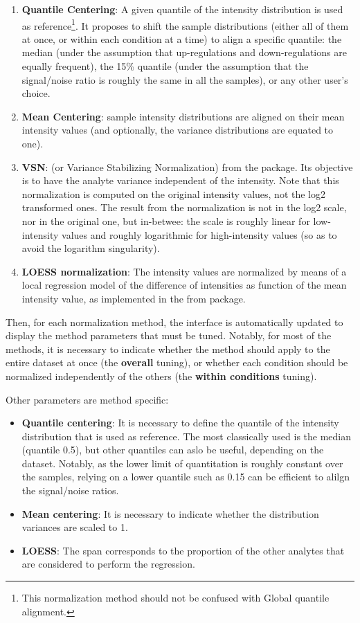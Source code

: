 \documentclass[12pt]{article}
\begin{document}
\begin{enumerate}
	\item \textbf{Quantile Centering}: A given quantile of the intensity distribution is used as reference\footnote{This normalization method should not be confused with Global quantile alignment.}. 
It proposes to shift the sample distributions 
(either all of them at once, or within each condition at a time) to align a specific 
quantile: the median (under the assumption that up-regulations and down-regulations 
are equally frequent), the 15\% quantile (under the assumption that the signal/noise ratio is 
roughly the same in all the samples), or any other user's choice.
	\item \textbf{Mean Centering}: sample intensity distributions are aligned on their mean intensity values (and optionally, the variance distributions are equated to one).
	\item \textbf{VSN}: (or Variance Stabilizing Normalization) from the  package. Its objective is to have the analyte variance independent of the intensity. Note that this normalization is computed on the original intensity values, not the log2 transformed ones. The result from the normalization is not in the log2 scale, nor in the original one, but in-betwee: the scale is roughly linear for low-intensity values and roughly logarithmic for high-intensity values (so as to avoid the logarithm singularity).
	\item \textbf{LOESS normalization}: The intensity values are normalized by means of a local regression model of the difference of intensities as function of the mean intensity value, as implemented in the  from  package.
\end{enumerate}

Then, for each normalization method, the interface is automatically updated to display the method parameters that must be tuned. Notably, for most of the methods, it is necessary to indicate whether the method should apply to the entire dataset at once (the \textbf{overall} tuning), or whether each condition should be normalized independently of the others (the \textbf{within conditions} tuning). 

Other parameters are method specific:
\begin{itemize}
	\item \textbf{Quantile centering}: It is necessary to define the quantile of the intensity distribution that is used as reference. The most classically used is the median (quantile 0.5), but other quantiles can aslo be useful, depending on the dataset. Notably, as the lower limit of quantitation is roughly constant over the samples, relying on a lower quantile such as 0.15 can be efficient to alilgn the signal/noise ratios.
	\item \textbf{Mean centering}: It is necessary to indicate whether the distribution variances are scaled to 1.
	\item \textbf{LOESS}: The span corresponds to the proportion of the other analytes that are considered to perform the regression.
\end{itemize}
\end{document}
